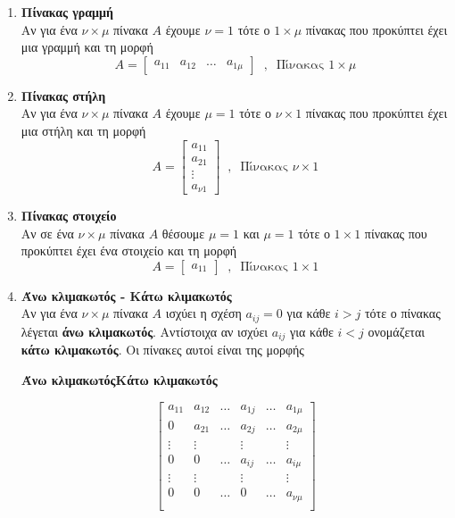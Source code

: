 \documentclass[twoside,11pt,a4paper]{book}
\begin{document}
\begin{enumerate}[itemsep=0mm,label=\bf\arabic*.]
\item \textbf{Πίνακας γραμμή}\\
Αν για ένα $ \nu\times\mu $ πίνακα $ A $ έχουμε $ \nu=1 $ τότε ο $ 1\times\mu $ πίνακας που προκύπτει έχει μια γραμμή και τη μορφή 
\[ A=\begin{bmatrix}
a_{11} & a_{12} & \ldots & a_{1\mu}
\end{bmatrix}\;\;,\;\;\textrm{Πίνακας }1\times\mu \]
\item \textbf{Πίνακας στήλη}\\
Αν για ένα $ \nu\times\mu $ πίνακα $ A $ έχουμε $ \mu=1 $ τότε ο $ \nu\times1 $ πίνακας που προκύπτει έχει μια στήλη και τη μορφή 
\[ A=\begin{bmatrix}
a_{11} \\ a_{21} \\ \vdots \\ a_{\nu1}
\end{bmatrix}\;\;,\;\;\textrm{Πίνακας }\nu\times1 \]
\item \textbf{Πίνακας στοιχείο}\\
Αν σε ένα $ \nu\times\mu $ πίνακα $ A $ θέσουμε $ \mu=1 $ και $ \mu=1 $ τότε ο $ 1\times1 $ πίνακας που προκύπτει έχει ένα στοιχείο και τη μορφή \[ A=\begin{bmatrix}
a_{11}
\end{bmatrix}\;\;,\;\;\textrm{Πίνακας }1\times1 \]
\item \textbf{Άνω κλιμακωτός - Κάτω κλιμακωτός}\\
Αν για ένα $ \nu\times\mu $ πίνακα $ A $ ισχύει η σχέση $ a_{ij}=0 $ για κάθε $ i>j $ τότε ο πίνακας λέγεται \textbf{άνω κλιμακωτός}. Αντίστοιχα αν ισχύει $ a_{ij} $ για κάθε $ i<j $ ονομάζεται \textbf{κάτω κλιμακωτός}. Οι πίνακες αυτοί είναι της μορφής 
\begin{center}
\textbf{Άνω κλιμακωτός}\qquad\qquad\qquad\qquad\textbf{Κάτω κλιμακωτός}
\end{center}
\[ \begin{bmatrix}
a_{11} & a_{12} & \ldots & a_{1j} & \ldots &  a_{1\mu}\\
0 & a_{21} & \ldots & a_{2j} & \ldots &  a_{2\mu}\\
\vdots & \vdots &  & \vdots &  &  \vdots\\
0 & 0 & \ldots & a_{ij} & \ldots &  a_{i\mu}\\
\vdots & \vdots &  & \vdots &  & \vdots\\
0 & 0 & \ldots & 0 & \ldots &  a_{\nu\mu}\\

\end{bmatrix}\]
\end{enumerate}
\end{document}
